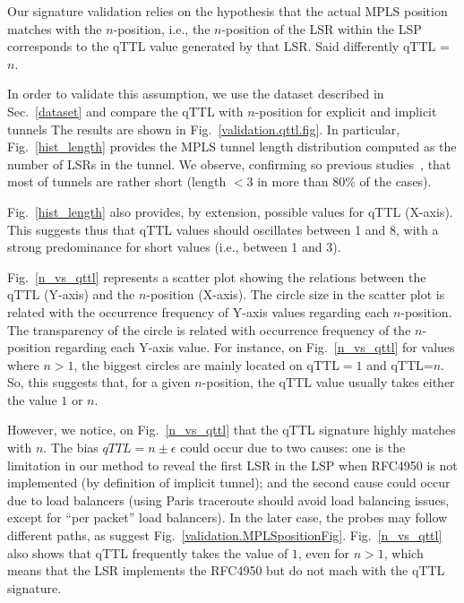 Our signature validation relies on the hypothesis that the actual MPLS position
matches with the $n$-position, i.e., the $n$-position of the LSR within the LSP
corresponds to the qTTL value generated by that LSR. Said differently qTTL =
$n$.

In order to validate this assumption, we use the dataset described in
Sec.~\ref{dataset} and compare the qTTL with $n$-position for explicit and
implicit tunnels
The results are shown in Fig.~\ref{validation.qttl.fig}.  In particular,
Fig.~\ref{hist_length} provides the MPLS tunnel length distribution computed as
the number of LSRs in the tunnel.  We observe, confirming so previous
studies~\cite{SOM11,Vanaubel15,Donnet12}, that most of tunnels are rather short
(length $< 3$ in more than 80\% of the cases).

Fig.~\ref{hist_length} also provides, by extension, possible values for qTTL
(X-axis).  This suggests thus that qTTL values should oscillates between 1 and
8, with a strong predominance for short values (i.e., between 1 and 3). 

Fig.~\ref{n_vs_qttl} represents a scatter plot showing the relations between the
qTTL (Y-axis) and the $n$-position (X-axis).  The circle size in the scatter
plot is related with the occurrence frequency of Y-axis values regarding each
$n$-position.  The transparency of the circle is related with occurrence
frequency of the $n$-position regarding each Y-axis value.  For instance, on
Fig.~\ref{n_vs_qttl} for values where $n>1$, the biggest circles are mainly
located on qTTL$=1$ and qTTL=$n$.  So, this suggests that, for a given
$n$-position, the qTTL value usually takes either the value $1$ or $n$.

However, we notice, on Fig.~\ref{n_vs_qttl} that the qTTL signature highly
matches with $n$.   The bias $\textit{qTTL}=n \pm \epsilon$ could occur due to
two causes: one is the limitation in our method to reveal the first LSR in the
LSP when RFC4950 is not implemented (by definition of implicit tunnel); and the
second cause could occur due to load balancers (using Paris traceroute should
avoid load balancing issues, except for ``per packet'' load balancers).
In the later case, the \traceroute probes may follow different paths, as suggest
Fig.~\ref{validation.MPLSpositionFig}. Fig.~\ref{n_vs_qttl} also shows that qTTL
frequently takes the value of $1$, even for $n>1$, which means that the LSR
implements the RFC4950 but do not mach with the qTTL signature. 

